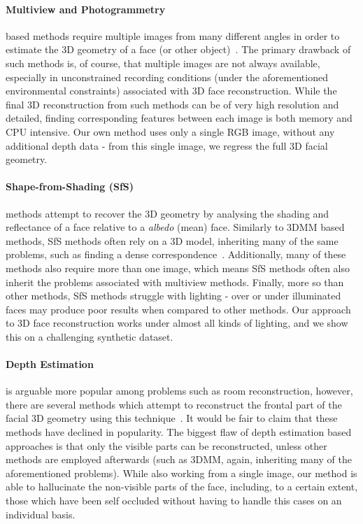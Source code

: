 \paragraph{Multiview and Photogrammetry} based methods require
multiple images from many different angles in order to estimate the 3D
geometry of a face (or other
object)~\cite{dou2018multi,dai2018coarse,Piotraschke_2016_CVPR,mayo20093d}. The
primary drawback of such methods is, of course, that multiple images
are not always available, especially in unconstrained recording
conditions (under the aforementioned environmental constraints)
associated with 3D face reconstruction. While the final 3D
reconstruction from such methods can be of very high resolution and
detailed, finding corresponding features between each image is both
memory and CPU intensive. Our own method uses only a single RGB image,
without any additional depth data - from this single image, we regress
the full 3D facial geometry.

\paragraph{Shape-from-Shading (SfS)} methods attempt to recover the 3D
geometry by analysing the shading and reflectance of a face relative
to a \textit{albedo} (mean) face. Similarly to 3DMM based methods, SfS
methods often rely on a 3D model, inheriting many of the same
problems, such as finding a dense
correspondence~\cite{suwajanakorn2014total,jiang20183d}. Additionally,
many of these methods also require more than one image, which means
SfS methods often also inherit the problems associated with multiview
methods. Finally, more so than other methods, SfS methods struggle
with lighting - over or under illuminated faces may produce poor
results when compared to other methods. Our approach to 3D face
reconstruction works under almost all kinds of lighting, and we show
this on a challenging synthetic dataset.

\paragraph{Depth Estimation} is arguable more popular among problems
such as room reconstruction, however, there are several methods which
attempt to reconstruct the frontal part of the facial 3D geometry
using this technique~\cite{sun2011depth,sun2013depth}. It would be
fair to claim that these methods have declined in popularity. The
biggest flaw of depth estimation based approaches is that only the
visible parts can be reconstructed, unless other methods are employed
afterwards (such as 3DMM, again, inheriting many of the aforementioned
problems). While also working from a single image, our method is able
to hallucinate the non-visible parts of the face, including, to a
certain extent, those which have been self occluded without having to
handle this cases on an individual basis.

